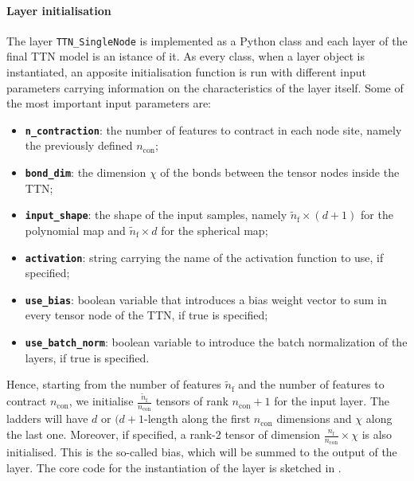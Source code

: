\documentclass[../main/main.tex]{subfiles}
\begin{document}
\paragraph{Layer initialisation}
The layer \texttt{TTN\_SingleNode} is implemented as a Python class and each layer of the final TTN model is an istance of it. As every class, when a layer object is instantiated, an apposite initialisation function is run with different input parameters carrying information on the characteristics of the layer itself. Some of the most important input parameters are:
\begin{itemize}
    \item \texttt{\bfseries n\_contraction}: the number of features to contract in each node site, namely the previously defined \( n_{\mathrm{con}} \);
    \item \texttt{\bfseries bond\_dim}: the dimension \( \chi \) of the bonds between the tensor nodes inside the TTN;
    \item \texttt{\bfseries input\_shape}: the shape of the input samples, namely \( \tilde{n}_{\mathrm{f}} \times (d+1) \) for the polynomial map and \( \tilde{n}_{\mathrm{f}} \times d \) for the spherical map;
    \item \texttt{\bfseries activation}: string carrying the name of the activation function to use, if specified;
    \item \texttt{\bfseries use\_bias}: boolean variable that introduces a bias weight vector to sum in every tensor node of the TTN, if true is specified;
    \item \texttt{\bfseries use\_batch\_norm}: boolean variable to introduce the batch normalization of the layers, if true is specified.
\end{itemize}

Hence, starting from the number of features \( \tilde{n}_{\mathrm{f}} \) and the number of features to contract \( n_{\mathrm{con}} \), we initialise \( \frac{\tilde{n}_{\mathrm{f}}}{n_{\mathrm{con}}} \) tensors of rank \( n_{\mathrm{con}} +1 \) for the input layer. The ladders will have \( d \) or \( (d+1 \)-length along the first \( n_{\mathrm{con}} \) dimensions and \( \chi \) along the last one. Moreover, if specified, a rank-2 tensor of dimension \( \frac{n_{\mathrm{f}}}{n_{\mathrm{con}}} \times \chi \) is also initialised. This is the so-called bias, which will be summed to the output of the layer. The core code for the instantiation of the layer is sketched in .
\end{document}
